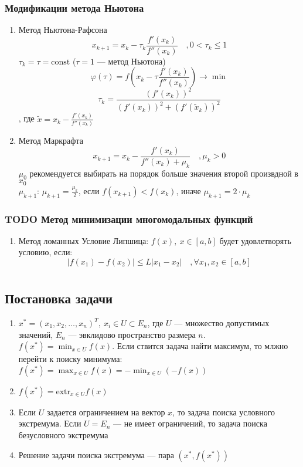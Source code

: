 \documentclass[oneside]{book}
\newcommand{\const}{\text{const}}
\theoremstyle{plain}
\theoremstyle{remark}
\theoremstyle{definition}
\begin{document}
\subsection{Модификации метода Ньютона}
\label{sec:org503f458}
\begin{enumerate}
\item Метод Ньютона-Рафсона
\label{sec:org09c3ed4}
\[ x_{k + 1} = x_k - \tau_k\frac{f'(x_k)}{f''(x_k)}\quad, 0 < \tau_k \le 1 \]
\(\tau_k = \tau = \const\) (\(\tau = 1\) --- метод Ньютона)
\[ \varphi(\tau) = f(x_k - \tau\frac{f'(x_k)}{f''(x_k)}) \to \min \]
\[ \tau_k = \frac{(f'(x_k))^2}{(f'(x_k))^2 + (f'(\tilde{x}_k))^2} \]
, где \(\tilde{x} = x_k - \frac{f'(x_k)}{f''(x_k)}\)
\item Метод Маркрафта
\label{sec:org9eda35b}
\[ x_{k + 1} = x_k - \frac{f'(x_k)}{f''(x_k) + \mu_k}\quad,\mu_k > 0 \]
\(\mu_0\) рекомендуется выбирать на порядок больше значения второй произвдной в \(x_0\) \\
\(\mu_{k + 1}\): \(\mu_{k + 1} = \frac{\mu_k}{2}\), если \(f(x_{k + 1}) < f(x_k)\), иначе \(\mu_{k + 1} = 2\cdot\mu_k\)
\end{enumerate}
\subsection{{\bfseries\sffamily TODO} Метод минимизации многомодальных функций}
\label{sec:org6613d7d}
\begin{enumerate}
\item Метод ломанных
\label{sec:orgecf7fad}
Условие Липшица: \(f(x),\ x\in [a, b]\) будет удовлетворять условию, если:
\[ |f(x_1) - f(x_2)| \le L|x_1 - x_2|\quad,\forall x_1, x_2 \in [a, b] \]
\end{enumerate}
\chapter{}
\label{sec:orgb8818ff}
\section{Постановка задачи}
\label{sec:org702a7f0}
\begin{enumerate}
\item \(x^* = (x_1, x_2, \dots, x_n)^T,\ x_i \in U \subset E_n\), где \(U\) --- множество допустимых значений, \(E_n\) --- эвклидово
пространство размера \(n\). \(f(x^*) = \min_{x \in U} f(x)\). Если
ствится задача найти максимум, то млжно перейти к поиску минимума: \(f(x^*) = \max_{x\in U}f(x) = -\min_{x \in U}(-f(x))\)
\item \(f(x^*) = \text{extr}_{x \in U}f(x)\)
\item Если \(U\) задается ограничением на вектор \(x\), то задача поиска
условного экстремума. Если \(U = E_n\) --- не имеет ограничений,
то задача поиска безусловного экстремума
\item Решение задачи поиска экстремума --- пара \((x^*, f(x^*))\)
\end{enumerate}
\end{document}
